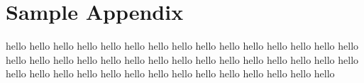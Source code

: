 \documentclass[11pt,letter,oneside]{book}
\begin{document}
\cleardoublepage
\begin{spacing}{1.25}


\end{spacing}


\clearpage
{}
{}
\appendix
\chapter{Sample Appendix}
hello hello hello hello hello hello hello hello hello hello hello hello hello hello hello hello hello hello hello hello hello hello
hello hello hello hello hello hello hello hello hello hello hello hello hello hello hello hello hello hello hello hello hello hello
\end{document}
